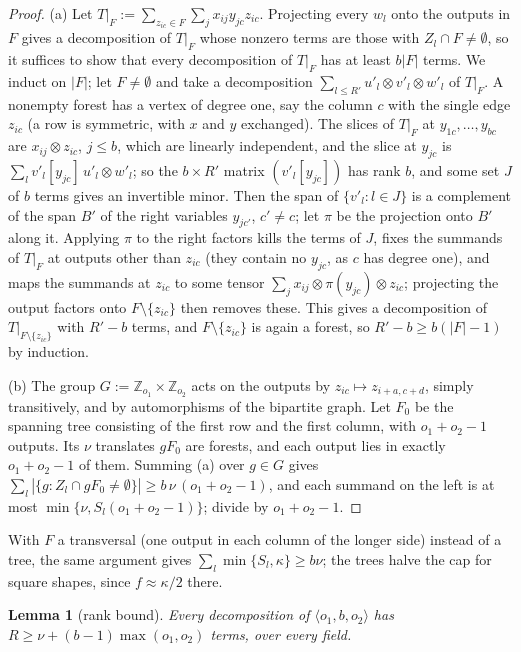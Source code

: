 \documentclass[11pt]{article}
\newtheorem{lemma}[theorem]{Lemma}
\theoremstyle{definition}
\theoremstyle{remark}
\begin{document}
\begin{proof}
(a) Let $T|_F:=\sum_{z_{ic}\in F}\sum_jx_{ij}y_{jc}z_{ic}$. Projecting every $w_l$ onto the outputs in $F$ gives a decomposition of $T|_F$ whose nonzero terms are those with $Z_l\cap F\ne\emptyset$, so it suffices to show that every decomposition of $T|_F$ has at least $b|F|$ terms. We induct on $|F|$; let $F\ne\emptyset$ and take a decomposition $\sum_{l\le R'}u'_l\otimes v'_l\otimes w'_l$ of $T|_F$. A nonempty forest has a vertex of degree one, say the column $c$ with the single edge $z_{ic}$ (a row is symmetric, with $x$ and $y$ exchanged). The slices of $T|_F$ at $y_{1c},\dots,y_{bc}$ are $x_{ij}\otimes z_{ic}$, $j\le b$, which are linearly independent, and the slice at $y_{jc}$ is $\sum_lv'_l[y_{jc}]\,u'_l\otimes w'_l$; so the $b\times R'$ matrix $(v'_l[y_{jc}])$ has rank $b$, and some set $J$ of $b$ terms gives an invertible minor. Then the span of $\{v'_l:l\in J\}$ is a complement of the span $B'$ of the right variables $y_{jc'}$, $c'\ne c$; let $\pi$ be the projection onto $B'$ along it. Applying $\pi$ to the right factors kills the terms of $J$, fixes the summands of $T|_F$ at outputs other than $z_{ic}$ (they contain no $y_{jc}$, as $c$ has degree one), and maps the summands at $z_{ic}$ to some tensor $\sum_jx_{ij}\otimes\pi(y_{jc})\otimes z_{ic}$; projecting the output factors onto $F\setminus\{z_{ic}\}$ then removes these. This gives a decomposition of $T|_{F\setminus\{z_{ic}\}}$ with $R'-b$ terms, and $F\setminus\{z_{ic}\}$ is again a forest, so $R'-b\ge b(|F|-1)$ by induction.

(b) The group $G:=\mathbb Z_{o_1}\times\mathbb Z_{o_2}$ acts on the outputs by $z_{ic}\mapsto z_{i+a,c+d}$, simply transitively, and by automorphisms of the bipartite graph. Let $F_0$ be the spanning tree consisting of the first row and the first column, with $o_1+o_2-1$ outputs. Its $\nu$ translates $gF_0$ are forests, and each output lies in exactly $o_1+o_2-1$ of them. Summing (a) over $g\in G$ gives $\sum_l|\{g:Z_l\cap gF_0\ne\emptyset\}|\ge b\,\nu\,(o_1+o_2-1)$, and each summand on the left is at most $\min\{\nu,S_l(o_1+o_2-1)\}$; divide by $o_1+o_2-1$.
\end{proof}

With $F$ a transversal (one output in each column of the longer side) instead of a tree, the same argument gives $\sum_l\min\{S_l,\kappa\}\ge b\nu$; the trees halve the cap for square shapes, since $f\approx\kappa/2$ there.

\begin{lemma}[rank bound]\label{a:lem:rankthin}
Every decomposition of $\langle o_1,b,o_2\rangle$ has $R\ge \nu+(b-1)\max(o_1,o_2)$ terms, over every field.
\end{lemma}
\end{document}
